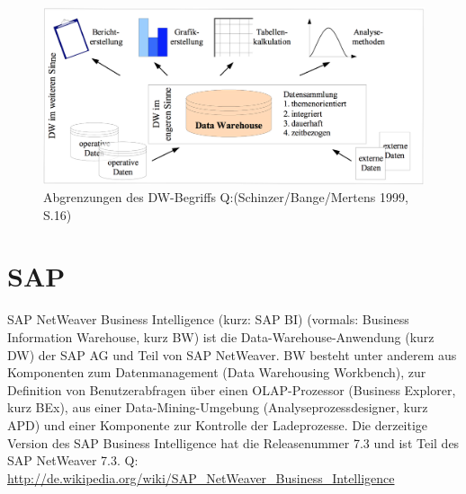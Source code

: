 \begin{figure}[H]
    \centering
    \includegraphics[width=1\textwidth]{files/DWOverview}
    \caption{Abgrenzungen des DW-Begriffs Q:(Schinzer/Bange/Mertens 1999, S.16)}
    \label{pic:DWOverview}
\end{figure}



\section{SAP}
\label{Kapitel:Einleitung}

SAP NetWeaver Business Intelligence (kurz: SAP BI) (vormals: Business Information Warehouse, kurz BW) ist die Data-Warehouse-Anwendung (kurz DW) der SAP AG und Teil von SAP NetWeaver. BW besteht unter anderem aus Komponenten zum Datenmanagement (Data Warehousing Workbench), zur Definition von Benutzerabfragen über einen OLAP-Prozessor (Business Explorer, kurz BEx), aus einer Data-Mining-Umgebung (Analyseprozessdesigner, kurz APD) und einer Komponente zur Kontrolle der Ladeprozesse. Die derzeitige Version des SAP Business Intelligence hat die Releasenummer 7.3 und ist Teil des SAP NetWeaver 7.3. 
Q: \url{http://de.wikipedia.org/wiki/SAP_NetWeaver_Business_Intelligence}